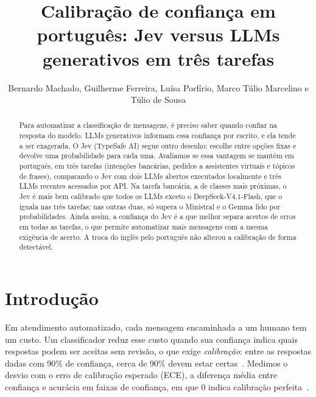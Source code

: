 \documentclass[sigconf,nonacm]{acmart}
\begin{document}
\setlength{\textfloatsep}{8pt plus 2pt minus 2pt}

\title{Calibração de confiança em português: Jev versus LLMs generativos em três tarefas}

\author{Bernardo Machado, Guilherme Ferreira, Luísa Porfírio, Marco Túlio Marcelino e Túlio de Sousa}
\renewcommand{\shortauthors}{Machado et al.}

\begin{abstract}
Para automatizar a classificação de mensagens, é preciso saber quando confiar na resposta do modelo. LLMs generativos informam essa confiança por escrito, e ela tende a ser exagerada. O Jev (TypeSafe AI) segue outro desenho: escolhe entre opções fixas e devolve uma probabilidade para cada uma. Avaliamos se essa vantagem se mantém em português, em três tarefas (intenções bancárias, pedidos a assistentes virtuais e tópicos de frases), comparando o Jev com dois LLMs abertos executados localmente e três LLMs recentes acessados por API. Na tarefa bancária, a de classes mais próximas, o Jev é mais bem calibrado que todos os LLMs exceto o DeepSeek-V4.1-Flash, que o iguala nas três tarefas; nas outras duas, só supera o Ministral e o Gemma lido por probabilidades. Ainda assim, a confiança do Jev é a que melhor separa acertos de erros em todas as tarefas, o que permite automatizar mais mensagens com a mesma exigência de acerto. A troca do inglês pelo português não alterou a calibração de forma detectável.
\end{abstract}

\maketitle

\section{Introdução}
Em atendimento automatizado, cada mensagem encaminhada a um humano tem um custo. Um classificador reduz esse custo quando sua confiança indica quais respostas podem ser aceitas sem revisão, o que exige \emph{calibração}: entre as respostas dadas com 90\% de confiança, cerca de 90\% devem estar certas~\cite{guo2017calibration}. Medimos o desvio com o erro de calibração esperado (ECE), a diferença média entre confiança e acurácia em faixas de confiança, em que 0 indica calibração perfeita~\cite{naeini2015ece}.
\end{document}
